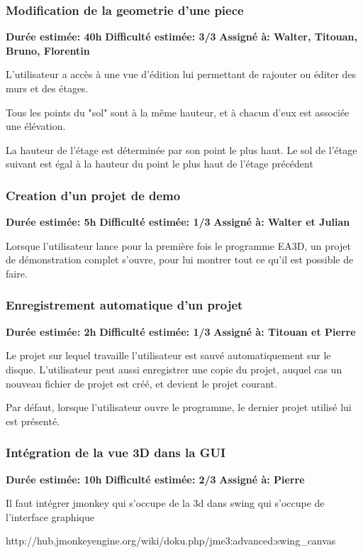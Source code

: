 \subsubsection{Modification de la geometrie d'une piece}

\textbf{Durée estimée: 40h} \textbf{Difficulté estimée: 3/3} \textbf{Assigné à: Walter, Titouan, Bruno, Florentin}

L'utilisateur a accès à une vue d'édition lui permettant de rajouter ou éditer des murs et des étages. 

Tous les points du "sol" sont à la même hauteur, et à chacun d'eux est associée une élévation.

La hauteur de l'étage est déterminée par son point le plus haut. Le sol de l'étage suivant est égal à la hauteur du point le plus haut de l'étage précédent
\subsubsection{Creation d'un projet de demo}

\textbf{Durée estimée: 5h} \textbf{Difficulté estimée: 1/3} \textbf{Assigné à: Walter et Julian}

Lorsque l'utilisateur lance pour la première fois le programme EA3D, un projet de démonstration complet s'ouvre, pour lui montrer tout ce qu'il est possible de faire.
\subsubsection{Enregistrement automatique d'un projet}

\textbf{Durée estimée: 2h} \textbf{Difficulté estimée: 1/3} \textbf{Assigné à: Titouan et Pierre}

Le projet sur lequel travaille l'utilisateur est sauvé automatiquement sur le disque. L'utilisateur peut aussi enregistrer une copie du projet, auquel cas un nouveau fichier de projet est créé, et devient le projet courant.

Par défaut, lorsque l'utilisateur ouvre le programme, le dernier projet utilisé lui est présenté.
\subsubsection{Intégration de la vue 3D dans la GUI}

\textbf{Durée estimée: 10h} \textbf{Difficulté estimée: 2/3} \textbf{Assigné à: Pierre}

Il faut intégrer jmonkey qui s'occupe de la 3d dans swing qui s'occupe de l'interface graphique

http://hub.jmonkeyengine.org/wiki/doku.php/jme3:advanced:swing\_canvas
